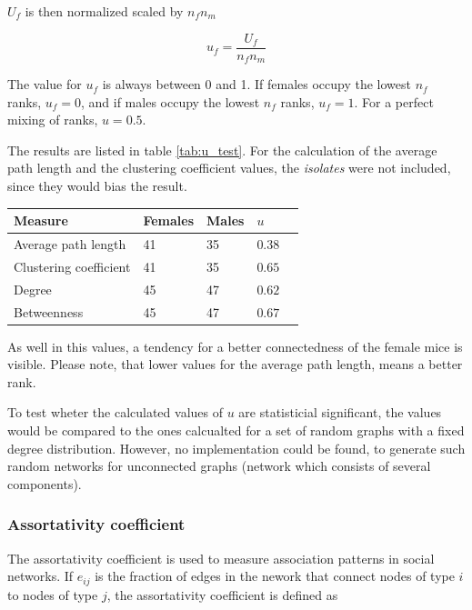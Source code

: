 $U_f$ is then normalized scaled by $n_fn_m$

\begin{equation}
u_f = \frac{U_f}{n_fn_m}
\label{eq:mann_w}
\end{equation}
 
The value for $u_f$ is always between 0 and 1. If females occupy the lowest $n_f$ ranks,  $u_f = 0$, and if males occupy the lowest $n_f$ ranks, $u_f=1$. For a perfect mixing of ranks, $u=0.5$.

The results are listed in table \ref{tab:u_test}. For the calculation of the average path length and the clustering coefficient values, the \textit{isolates} were not included, since they would bias the result.

\begin{center} 
\renewcommand\arraystretch{1.2}
\begin{tabular}{lllll}
\toprule
\textbf{Measure} &	\textbf{Females}	& \textbf{Males}	& \textbf{$u$} \\\midrule
Average path length	&	41	&	35	& $0.38$\\
Clustering coefficient	&	41	&	35	&  $0.65$ \\
Degree	&	45 	& 	47 	& $0.62$	\\
Betweenness	&	45	&	47	&	$0.67$ \\\bottomrule

\end{tabular}
\label{tab:u_test}
\end{center}

As well in this values, a tendency for a better connectedness of the female mice is visible. Please note, that lower values for the average path length, means a better rank.

To test wheter the calculated values of $u$ are statisticial significant, the values would be compared to the ones calcualted for a set of random graphs with a fixed degree distribution\cite{croft:07}\cite{newman:02a}. However, no implementation could be found, to generate such random networks for unconnected graphs (network which consists of  several components).

\subsubsection{Assortativity coefficient}
\label{subsubsec:assortivity}     

The assortativity coefficient\cite{newman:03} is used to measure association patterns in social networks. If $e_{ij}$ is the fraction of edges in the nework that connect nodes of type $i$ to nodes of type $j$, the assortativity coefficient is defined as

